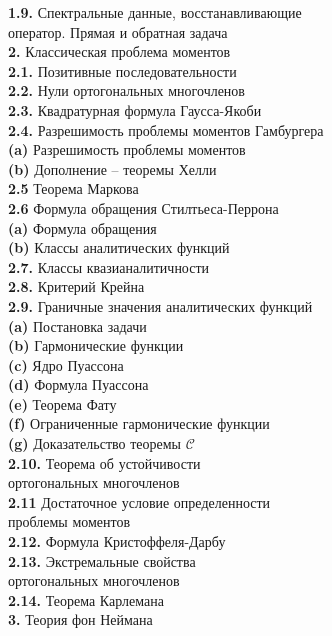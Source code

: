 \documentclass[12pt,a4paper]{article}
\theoremstyle{plain}   \newtheorem{Pro}{Задача}
\begin{document}
{\bfseries 1.9.}
Спектральные данные, восстанавливающие \\
оператор.
Прямая и обратная задача
$$ \; $$
{\Large \bfseries 2.}
Классическая проблема моментов \\
{\bfseries 2.1.}
Позитивные последовательности \\
{\bfseries 2.2.}
Нули ортогональных многочленов \\
{\bfseries 2.3.}
Квадратурная формула Гаусса-Якоби \\
{\bfseries 2.4.}
Разрешимость проблемы моментов Гамбургера \\
{\bfseries (a)}
Разрешимость проблемы моментов \\
{\bfseries (b)}
Дополнение -- теоремы Хелли \\
{\bfseries 2.5}
Теорема Маркова \\
{\bfseries 2.6}
Формула обращения Стилтьеса-Перрона \\
{\bfseries (a)}
Формула обращения \\
{\bfseries (b)}
Классы аналитических функций \\
{\bfseries 2.7.}
Классы квазианалитичности \\
{\bfseries 2.8.}
Критерий Крейна \\
{\bfseries 2.9.}
Граничные значения аналитических функций \\
{\bfseries (a)}
Постановка задачи \\
{\bfseries (b)}
Гармонические функции \\
{\bfseries (c)}
Ядро Пуассона \\
{\bfseries (d)}
Формула Пуассона \\
{\bfseries (e)}
Теорема Фату \\
{\bfseries (f)}
Ограниченные гармонические функции \\
{\bfseries (g)}
Доказательство теоремы $ \mathcal{C} $ \\
{\bfseries 2.10.}
Теорема об устойчивости \\
ортогональных многочленов \\
{\bfseries 2.11}
Достаточное условие определенности \\
проблемы моментов \\
{\bfseries 2.12.}
Формула Кристоффеля-Дарбу \\
{\bfseries 2.13.}
Экстремальные свойства \\
ортогональных многочленов \\
{\bfseries 2.14.}
Теорема Карлемана
$$ \; $$
{\Large \bfseries 3.}
Теория фон Неймана \\
\end{document}
